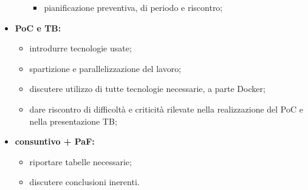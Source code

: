 \begin{itemize}
\begin{itemize}
\begin{itemize}
            \item pianificazione preventiva, di periodo e riscontro;
        \end{itemize}
    \end{itemize}
    \item \textbf{PoC e TB:}
    \begin{itemize}
        \item introdurre tecnologie usate;
        \item spartizione e parallelizzazione del lavoro;
        \item discutere utilizzo di tutte tecnologie necessarie, a parte Docker;
        \item dare riscontro di difficoltà e criticità rilevate nella realizzazione del PoC e nella presentazione TB;
    \end{itemize}
    \item \textbf{consuntivo + PaF:}
    \begin{itemize}
        \item riportare tabelle necessarie;
        \item discutere conclusioni inerenti.
    \end{itemize}
\end{itemize}